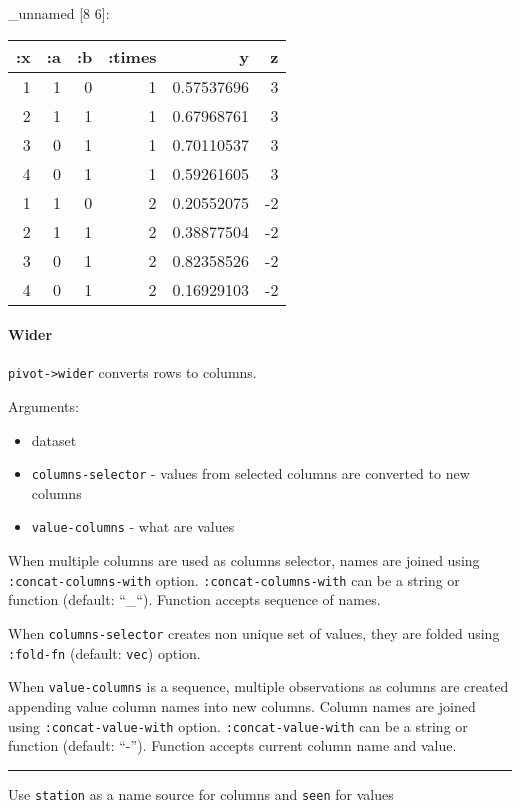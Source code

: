 \documentclass[]{article}
\providecommand{\tightlist}{%
  \setlength{\itemsep}{0pt}\setlength{\parskip}{0pt}}
\let\oldparagraph\paragraph
\renewcommand{\paragraph}[1]{\oldparagraph{#1}\mbox{}}
\begin{document}
\_unnamed {[}8 6{]}:

\begin{longtable}[]{@{}rrrrrr@{}}
\toprule
:x & :a & :b & :times & y & z\tabularnewline
\midrule
\endhead
1 & 1 & 0 & 1 & 0.57537696 & 3\tabularnewline
2 & 1 & 1 & 1 & 0.67968761 & 3\tabularnewline
3 & 0 & 1 & 1 & 0.70110537 & 3\tabularnewline
4 & 0 & 1 & 1 & 0.59261605 & 3\tabularnewline
1 & 1 & 0 & 2 & 0.20552075 & -2\tabularnewline
2 & 1 & 1 & 2 & 0.38877504 & -2\tabularnewline
3 & 0 & 1 & 2 & 0.82358526 & -2\tabularnewline
4 & 0 & 1 & 2 & 0.16929103 & -2\tabularnewline
\bottomrule
\end{longtable}

\paragraph{Wider}\label{wider}

\texttt{pivot-\textgreater{}wider} converts rows to columns.

Arguments:

\begin{itemize}
\tightlist
\item
  dataset
\item
  \texttt{columns-selector} - values from selected columns are converted
  to new columns
\item
  \texttt{value-columns} - what are values
\end{itemize}

When multiple columns are used as columns selector, names are joined
using \texttt{:concat-columns-with} option.
\texttt{:concat-columns-with} can be a string or function (default:
``\_``). Function accepts sequence of names.

When \texttt{columns-selector} creates non unique set of values, they
are folded using \texttt{:fold-fn} (default: \texttt{vec}) option.

When \texttt{value-columns} is a sequence, multiple observations as
columns are created appending value column names into new columns.
Column names are joined using \texttt{:concat-value-with} option.
\texttt{:concat-value-with} can be a string or function (default:
``-''). Function accepts current column name and value.

\begin{center}\rule{0.5\linewidth}{0.5pt}\end{center}

Use \texttt{station} as a name source for columns and \texttt{seen} for
values
\end{document}
